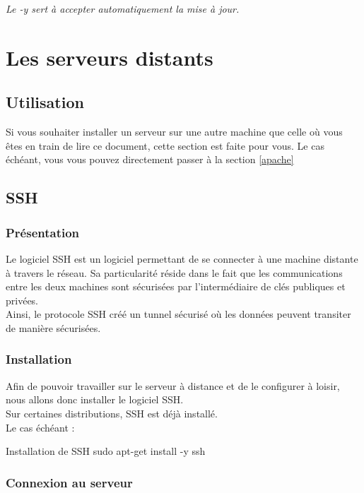 \textit{Le -y sert à accepter automatiquement la mise à jour.}



\chapter{Les serveurs distants}

\section{Utilisation}
Si vous souhaiter installer un serveur sur une autre machine que celle où vous êtes en train de lire ce document, cette section est faite pour vous. Le cas échéant, vous vous pouvez directement passer à la section \ref{apache}

\section{SSH}

\subsection{Présentation}
Le logiciel SSH est un logiciel permettant de se connecter à une machine distante à travers le réseau. Sa particularité réside dans le fait que les communications entre les deux machines sont sécurisées par l’intermédiaire de clés publiques et privées.\\

Ainsi, le protocole SSH créé un tunnel sécurisé où les données peuvent transiter de manière sécurisées.  \\

\subsection{Installation}
Afin de pouvoir travailler sur le serveur à distance et de le configurer à loisir, nous allons donc installer le logiciel SSH. \\
Sur certaines distributions, SSH est déjà installé. \\
Le cas échéant : 
\begin{Bash}{Installation de SSH}
sudo apt-get install -y ssh
\end{Bash} 

\subsection{Connexion au serveur} \label{ssh_login}

